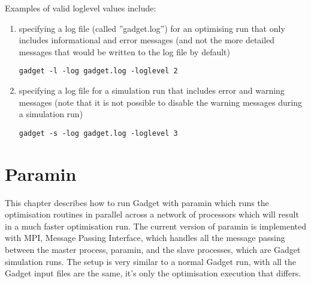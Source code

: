 \documentclass[10pt,twoside]{book}
\begin{document}
\bigskip
Examples of valid loglevel values include:

\begin{enumerate}
\item specifying a log file (called ''gadget.log'') for an optimising run that only includes informational and error messages (and not the more detailed messages that would be written to the log file by default)
{\small\begin{verbatim}
gadget -l -log gadget.log -loglevel 2
\end{verbatim}}
\item specifying a log file for a simulation run that includes error and warning messages (note that it is not possible to disable the warning messages during a simulation run)
{\small\begin{verbatim}
gadget -s -log gadget.log -loglevel 3
\end{verbatim}}
\end{enumerate}


\chapter{Paramin}\label{chap:paramin}
This chapter describes how to run Gadget with paramin which runs the optimisation routines in parallel across a network of processors which will result in a much faster optimisation run.  The current version of paramin is implemented with MPI, Message Passing Interface, which handles all the message passing between the master process, paramin, and the slave processes, which are Gadget simulation runs.  The setup is very similar to a normal Gadget run, with all the Gadget input files are the same, it's only the optimisation execution that differs.
\end{document}
